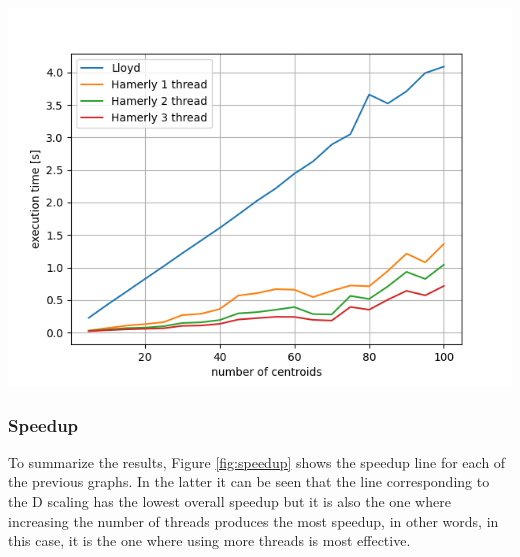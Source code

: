 \documentclass{report}
\begin{document}
\begin{minipage}[b]{0.48\textwidth}
  \begin{center} 
    \includegraphics[width = 1\textwidth]{imgs/lh123_3Drnd_dim.png}
    \label{fig:lh123_3Drnd_dim}
  \end{center}

  \subsubsection*{Speedup}
  To summarize the results, Figure \ref{fig:speedup} shows the speedup line for each of the previous graphs. In the latter it can be seen that the line corresponding to the D scaling has the lowest overall speedup but it is also the one where increasing the number of threads produces the most speedup, in other words, in this case, it is the one where using more threads is most effective.
  

\end{minipage}

\newpage
\end{document}
